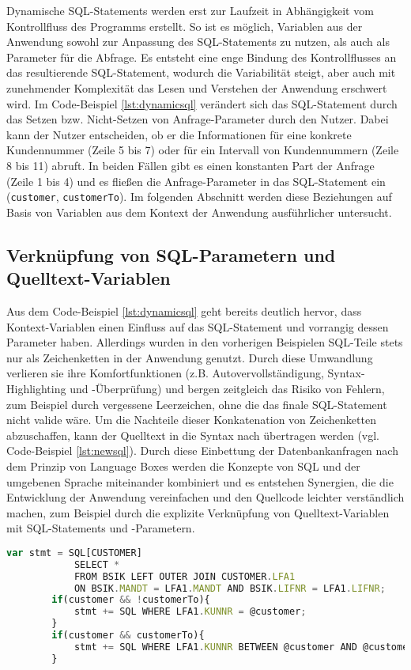 Dynamische SQL-Statements werden erst zur Laufzeit in Abhängigkeit vom Kontrollfluss des Programms erstellt.
So ist es möglich, Variablen aus der Anwendung sowohl zur Anpassung des SQL-Statements zu nutzen, als auch als Parameter für die Abfrage.
Es entsteht eine enge Bindung des Kontrollflusses an das resultierende SQL-Statement, wodurch die Variabilität steigt, aber auch mit zunehmender Komplexität das Lesen und Verstehen der Anwendung erschwert wird.
Im Code-Beispiel \ref{lst:dynamicsql} verändert sich das SQL-Statement durch das Setzen bzw. Nicht-Setzen von Anfrage-Parameter durch den Nutzer.
Dabei kann der Nutzer entscheiden, ob er die Informationen für eine konkrete Kundennummer (Zeile 5 bis 7) oder für ein Intervall von Kundennummern (Zeile 8 bis 11) abruft.
In beiden Fällen gibt es einen konstanten Part der Anfrage (Zeile 1 bis 4) und es fließen die Anfrage-Parameter in das SQL-Statement ein (\texttt{customer}, \texttt{customerTo}).
Im folgenden Abschnitt werden diese Beziehungen auf Basis von Variablen aus dem Kontext der Anwendung ausführlicher untersucht.


\subsection{Verkn{\"u}pfung von SQL-Parametern und Quelltext-Variablen}
Aus dem Code-Beispiel \ref{lst:dynamicsql} geht bereits deutlich hervor, dass Kontext-Variablen einen Einfluss auf das SQL-Statement und vorrangig dessen Parameter haben.
Allerdings wurden in den vorherigen Beispielen SQL-Teile stets nur als Zeichenketten in der Anwendung genutzt.
Durch diese Umwandlung verlieren sie ihre Komfortfunktionen (z.B. Autovervollständigung, Syntax-Highlighting und -Überprüfung) und bergen zeitgleich das Risiko von Fehlern, zum Beispiel durch vergessene Leerzeichen, ohne die das finale SQL-Statement nicht valide wäre.
Um die Nachteile dieser Konkatenation von Zeichenketten abzuschaffen, kann der Quelltext in die Syntax nach \cite{Horschig2014} übertragen werden (vgl. Code-Beispiel \ref{lst:newsql}).
Durch diese Einbettung der Datenbankanfragen nach dem Prinzip von Language Boxes \cite{diekmann2013parsing} werden die Konzepte von SQL und der umgebenen Sprache miteinander kombiniert und es entstehen Synergien, die die Entwicklung der Anwendung vereinfachen und den Quellcode leichter verständlich machen, zum Beispiel durch die explizite Verknüpfung von Quelltext-Variablen mit SQL-Statements und -Parametern.

	\begin{lstlisting}[caption={Übertragung des Code-Beispiels \ref{lst:dynamicsql} in die Syntax nach \cite{Horschig2014}}, label={lst:newsql}, language=JavaScript]
		var stmt = SQL[CUSTOMER]
			SELECT *
			FROM BSIK LEFT OUTER JOIN CUSTOMER.LFA1
			ON BSIK.MANDT = LFA1.MANDT AND BSIK.LIFNR = LFA1.LIFNR;
		if(customer && !customerTo){
			stmt += SQL WHERE LFA1.KUNNR = @customer;
		}
		if(customer && customerTo){
			stmt += SQL WHERE LFA1.KUNNR BETWEEN @customer AND @customerTo;
		}
	\end{lstlisting}


